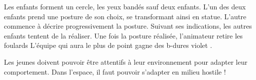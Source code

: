 \documentclass{grand-jeu}
\begin{document}
\begin{liste-materiel}
\end{liste-materiel}

\begin{regles}

Les enfants forment un cercle, les yeux bandés sauf deux enfants. L’un des deux enfants prend une posture de son choix, se transformant ainsi en statue. L’autre commence à décrire progressivement la posture. Suivant ses indications, les autres enfants tentent de la réaliser. Une fois la posture réalisée, l’animateur retire les foulards
L'équipe qui aura le plus de point  gagne des b-dures violet .
\end{regles}

\begin{imaginaire}
Les jeunes doivent pouvoir être attentifs à leur environnement pour adapter leur comportement. Dans l'espace, il faut pouvoir s'adapter en milieu hostile ! 
\end{imaginaire}

\begin{moments-stop}
\end{moments-stop}
\end{document}
